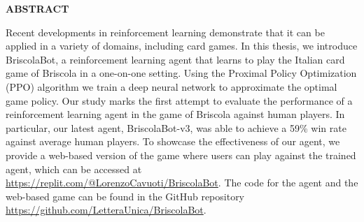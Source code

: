 \begin{center}
    \bf ABSTRACT
\end{center}
Recent developments in reinforcement learning demonstrate that it can be applied in a variety of domains, including card games. In this thesis, we introduce BriscolaBot, a reinforcement learning agent that learns to play the Italian card game of Briscola in a one-on-one setting. Using the Proximal Policy Optimization (PPO) algorithm we train a deep neural network to approximate the optimal game policy. Our study marks the first attempt to evaluate the performance of a reinforcement learning agent in the game of Briscola against human players. In particular, our latest agent, BriscolaBot-v3, was able to achieve a 59\% win rate against average human players. To showcase the effectiveness of our agent, we provide a web-based version of the game where users can play against the trained agent, which can be accessed at \url{https://replit.com/@LorenzoCavuoti/BriscolaBot}. The code for the agent and the web-based game can be found in the GitHub repository \url{https://github.com/LetteraUnica/BriscolaBot}.